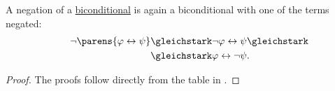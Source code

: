 \begin{proposition}
\begin{thmenum}
     A negation of a \hyperref[def:propositional_language/connectives/biconditional]{biconditional} is again a biconditional with one of the terms negated:
    \begin{equation}\label{eq:thm:boolean_equivalences/biconditional_negation}
      \begin{split}
        \mathllap{\neg \parens{\varphi \leftrightarrow \psi}}
        &\gleichstark
        \mathrlap{\neg \varphi \leftrightarrow \psi \gleichstark}
        \\ &\gleichstark
        \mathrlap{\varphi \leftrightarrow \neg \psi.}
      \end{split}
    \end{equation}
  \end{thmenum}
\end{proposition}
\begin{proof}
  The proofs follow directly from the table in .
\end{proof}

